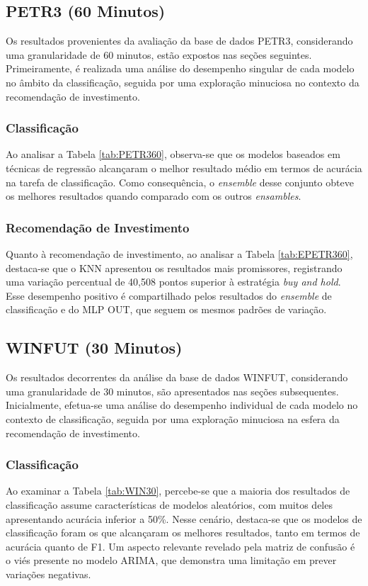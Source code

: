 \subsection{PETR3 (60 Minutos)}
Os resultados provenientes da avaliação da base de dados PETR3, considerando uma granularidade de 60 minutos, estão expostos nas seções seguintes. Primeiramente, é realizada uma análise do desempenho singular de cada modelo no âmbito da classificação, seguida por uma exploração minuciosa no contexto da recomendação de investimento.
\subsubsection{Classificação}
Ao analisar a Tabela \ref{tab:PETR360}, observa-se que os modelos baseados em técnicas de regressão alcançaram o melhor resultado médio em termos de acurácia na tarefa de classificação. Como consequência, o \textit{ensemble} desse conjunto obteve os melhores resultados quando comparado com os outros \textit{ensambles}.
\subsubsection{Recomendação de Investimento}
Quanto à recomendação de investimento, ao analisar a Tabela \ref{tab:EPETR360}, destaca-se que o \ac{KNN} apresentou os resultados mais promissores, registrando uma variação percentual de 40,508 pontos superior à estratégia \textit{buy and hold}. Esse desempenho positivo é compartilhado pelos resultados do \textit{ensemble} de classificação e do \ac{MLP} OUT, que seguem os mesmos padrões de variação.

\subsection{WINFUT (30 Minutos)}
Os resultados decorrentes da análise da base de dados WINFUT, considerando uma granularidade de 30 minutos, são apresentados nas seções subsequentes. Inicialmente, efetua-se uma análise do desempenho individual de cada modelo no contexto de classificação, seguida por uma exploração minuciosa na esfera da recomendação de investimento.
\subsubsection{Classificação}
Ao examinar a Tabela \ref{tab:WIN30}, percebe-se que a maioria dos resultados de classificação assume características de modelos aleatórios, com muitos deles apresentando acurácia inferior a 50\%. Nesse cenário, destaca-se que os modelos de classificação foram os que alcançaram os melhores resultados, tanto em termos de acurácia quanto de \ac{F1}. Um aspecto relevante revelado pela matriz de confusão é o viés presente no modelo ARIMA, que demonstra uma limitação em prever variações negativas.
